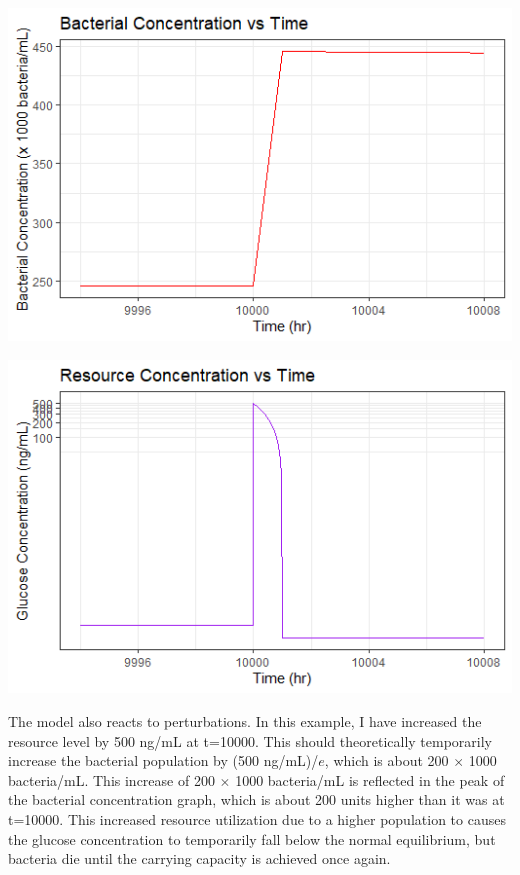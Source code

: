 \documentclass{article}
\begin{document}
\begin{center}
\includegraphics[scale=0.75]{plots/NoPhage_U_perturbed_zoomed.png}

\includegraphics[scale=0.75]{plots/NoPhage_R_perturbed_zoomed.png}
\end{center}


The model also reacts to perturbations. In this example, I have increased the resource level by 500 ng/mL at t=10000. This should theoretically temporarily increase the bacterial population by (500 ng/mL)/$e$, which is about 200 $\times$ 1000 bacteria/mL. This increase of 200 $\times$ 1000 bacteria/mL is reflected in the peak of the bacterial concentration graph, which is about 200 units higher than it was at t=10000. This increased resource utilization due to a higher population to causes the glucose concentration to temporarily fall below the normal equilibrium, but bacteria die until the carrying capacity is achieved once again. 
\end{document}
